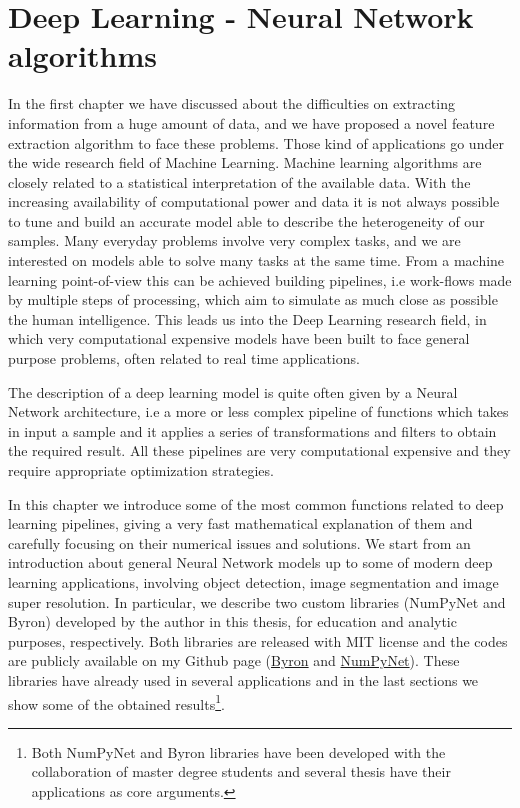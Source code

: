 \documentclass{standalone}
\begin{document}
\chapter[Deep Learning]{Deep Learning - Neural Network algorithms}\label{chapter2:neural}

In the first chapter we have discussed about the difficulties on extracting information from a huge amount of data, and we have proposed a novel feature extraction algorithm to face these problems.
Those kind of applications go under the wide research field of Machine Learning.
Machine learning algorithms are closely related to a statistical interpretation of the available data.
With the increasing availability of computational power and data it is not always possible to tune and build an accurate model able to describe the heterogeneity of our samples.
Many everyday problems involve very complex tasks, and we are interested on models able to solve many tasks at the same time.
From a machine learning point-of-view this can be achieved building pipelines, i.e work-flows made by multiple steps of processing, which aim to simulate as much close as possible the human intelligence.
This leads us into the Deep Learning research field, in which very computational expensive models have been built to face general purpose problems, often related to real time applications.

The description of a deep learning model is quite often given by a Neural Network architecture, i.e a more or less complex pipeline of functions which takes in input a sample and it applies a series of transformations and filters to obtain the required result.
All these pipelines are very computational expensive and they require appropriate optimization strategies.

In this chapter we introduce some of the most common functions related to deep learning pipelines, giving a very fast mathematical explanation of them and carefully focusing on their numerical issues and solutions.
We start from an introduction about general Neural Network models up to some of modern deep learning applications, involving object detection, image segmentation and image super resolution.
In particular, we describe two custom libraries (\textsf{NumPyNet} and \textsf{Byron}) developed by the author in this thesis, for education and analytic purposes, respectively.
Both libraries are released with MIT license and the codes are publicly available on my Github page (\href{https://github.com/Nico-Curti/Byron}{Byron} and \href{https://github.com/Nico-Curti/NumPyNet}{NumPyNet}).
These libraries have already used in several applications and in the last sections we show some of the obtained results\footnote{
  Both \textsf{NumPyNet} and \textsf{Byron} libraries have been developed with the collaboration of master degree students and several thesis have their applications as core arguments.
}.
\end{document}
